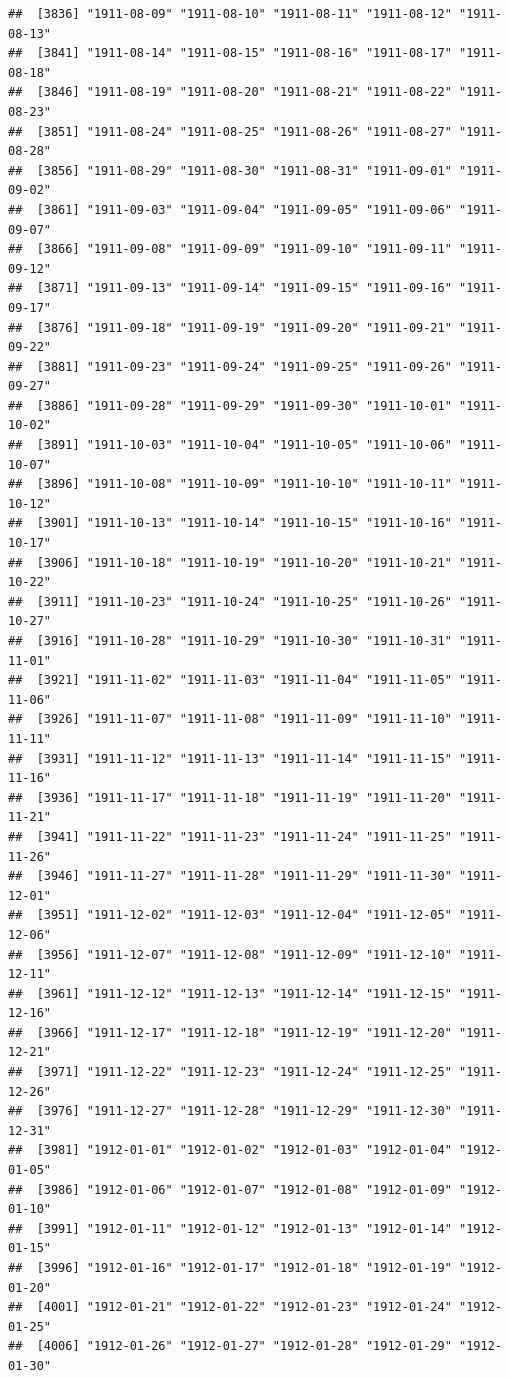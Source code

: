\documentclass{article}\usepackage[]{graphicx}\usepackage[]{color}
\makeatletter
\newenvironment{kframe}{%
 \def\at@end@of@kframe{}%
 \ifinner\ifhmode%
  \def\at@end@of@kframe{\end{minipage}}%
  \begin{minipage}{\columnwidth}%
 \fi\fi%
 \def\FrameCommand##1{\hskip\@totalleftmargin \hskip-\fboxsep
 \colorbox{shadecolor}{##1}\hskip-\fboxsep
     \hskip-\linewidth \hskip-\@totalleftmargin \hskip\columnwidth}%
 \MakeFramed {\advance\hsize-\width
   \@totalleftmargin\z@ \linewidth\hsize
   \@setminipage}}%
 {\par\unskip\endMakeFramed%
 \at@end@of@kframe}
\newenvironment{knitrout}{}{} %
\makeatother
\begin{document}
\begin{description}
\begin{knitrout}
\begin{kframe}
\begin{verbatim}
##  [3836] "1911-08-09" "1911-08-10" "1911-08-11" "1911-08-12" "1911-08-13"
##  [3841] "1911-08-14" "1911-08-15" "1911-08-16" "1911-08-17" "1911-08-18"
##  [3846] "1911-08-19" "1911-08-20" "1911-08-21" "1911-08-22" "1911-08-23"
##  [3851] "1911-08-24" "1911-08-25" "1911-08-26" "1911-08-27" "1911-08-28"
##  [3856] "1911-08-29" "1911-08-30" "1911-08-31" "1911-09-01" "1911-09-02"
##  [3861] "1911-09-03" "1911-09-04" "1911-09-05" "1911-09-06" "1911-09-07"
##  [3866] "1911-09-08" "1911-09-09" "1911-09-10" "1911-09-11" "1911-09-12"
##  [3871] "1911-09-13" "1911-09-14" "1911-09-15" "1911-09-16" "1911-09-17"
##  [3876] "1911-09-18" "1911-09-19" "1911-09-20" "1911-09-21" "1911-09-22"
##  [3881] "1911-09-23" "1911-09-24" "1911-09-25" "1911-09-26" "1911-09-27"
##  [3886] "1911-09-28" "1911-09-29" "1911-09-30" "1911-10-01" "1911-10-02"
##  [3891] "1911-10-03" "1911-10-04" "1911-10-05" "1911-10-06" "1911-10-07"
##  [3896] "1911-10-08" "1911-10-09" "1911-10-10" "1911-10-11" "1911-10-12"
##  [3901] "1911-10-13" "1911-10-14" "1911-10-15" "1911-10-16" "1911-10-17"
##  [3906] "1911-10-18" "1911-10-19" "1911-10-20" "1911-10-21" "1911-10-22"
##  [3911] "1911-10-23" "1911-10-24" "1911-10-25" "1911-10-26" "1911-10-27"
##  [3916] "1911-10-28" "1911-10-29" "1911-10-30" "1911-10-31" "1911-11-01"
##  [3921] "1911-11-02" "1911-11-03" "1911-11-04" "1911-11-05" "1911-11-06"
##  [3926] "1911-11-07" "1911-11-08" "1911-11-09" "1911-11-10" "1911-11-11"
##  [3931] "1911-11-12" "1911-11-13" "1911-11-14" "1911-11-15" "1911-11-16"
##  [3936] "1911-11-17" "1911-11-18" "1911-11-19" "1911-11-20" "1911-11-21"
##  [3941] "1911-11-22" "1911-11-23" "1911-11-24" "1911-11-25" "1911-11-26"
##  [3946] "1911-11-27" "1911-11-28" "1911-11-29" "1911-11-30" "1911-12-01"
##  [3951] "1911-12-02" "1911-12-03" "1911-12-04" "1911-12-05" "1911-12-06"
##  [3956] "1911-12-07" "1911-12-08" "1911-12-09" "1911-12-10" "1911-12-11"
##  [3961] "1911-12-12" "1911-12-13" "1911-12-14" "1911-12-15" "1911-12-16"
##  [3966] "1911-12-17" "1911-12-18" "1911-12-19" "1911-12-20" "1911-12-21"
##  [3971] "1911-12-22" "1911-12-23" "1911-12-24" "1911-12-25" "1911-12-26"
##  [3976] "1911-12-27" "1911-12-28" "1911-12-29" "1911-12-30" "1911-12-31"
##  [3981] "1912-01-01" "1912-01-02" "1912-01-03" "1912-01-04" "1912-01-05"
##  [3986] "1912-01-06" "1912-01-07" "1912-01-08" "1912-01-09" "1912-01-10"
##  [3991] "1912-01-11" "1912-01-12" "1912-01-13" "1912-01-14" "1912-01-15"
##  [3996] "1912-01-16" "1912-01-17" "1912-01-18" "1912-01-19" "1912-01-20"
##  [4001] "1912-01-21" "1912-01-22" "1912-01-23" "1912-01-24" "1912-01-25"
##  [4006] "1912-01-26" "1912-01-27" "1912-01-28" "1912-01-29" "1912-01-30"

\end{verbatim}
\end{kframe}
\end{knitrout}
\end{description}
\end{document}
